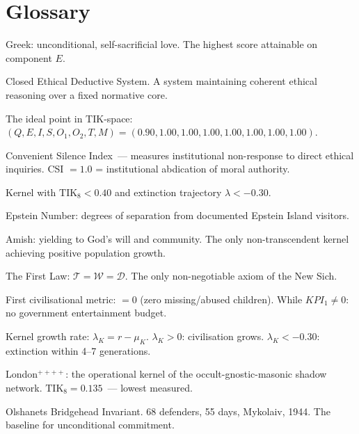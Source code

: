 \documentclass[11pt,a4paper]{article}
\theoremstyle{definition}
\theoremstyle{remark}
\newcommand{\TIKeight}{\text{TIK}_8}
\newcommand{\ChristVector}{\vec{\mathcal{C}}}
\newcommand{\LondonOp}{\mathcal{L}^{++++}}  %
\newcommand{\Thought}{\mathcal{T}}
\newcommand{\Word}{\mathcal{W}}
\newcommand{\Deed}{\mathcal{D}}
\newcommand{\IntegrityAxiom}{\Thought = \Word = \Deed}
\begin{document}
\section{Glossary}
\label{app:glossary}

\begin{description}[leftmargin=2.5cm, style=nextline]
  \item[$\text{Agape}$]
    Greek: unconditional, self-sacrificial love.
    The highest score attainable on component $E$.
  \item[CEDS]
    Closed Ethical Deductive System.
    A system maintaining coherent ethical reasoning
    over a fixed normative core.
  \item[$\ChristVector$]
    The ideal point in TIK-space:
    $(Q,E,I,S,O_1,O_2,T,M) = (0.90, 1.00, 1.00, 1.00, 1.00, 1.00, 1.00, 1.00)$.
  \item[CSI]
    Convenient Silence Index~--- measures institutional non-response
    to direct ethical inquiries.
    CSI $= 1.0$ = institutional abdication of moral authority.
  \item[Death Cult]
    Kernel with $\TIKeight < 0.40$ and extinction trajectory
    $\lambda < -0.30$.
  \item[$\text{E}_n$]
    Epstein Number: degrees of separation from documented
    Epstein Island visitors.
  \item[Gelassenheit]
    Amish: yielding to God's will and community.
    The only non-transcendent kernel achieving
    positive population growth.
  \item[$\IntegrityAxiom$]
    The First Law: $\Thought = \Word = \Deed$.
    The only non-negotiable axiom of the New Sich.
  \item[$KPI_1$]
    First civilisational metric: $= 0$ (zero missing/abused children).
    While $KPI_1 \neq 0$: no government entertainment budget.
  \item[$\lambda_K$]
    Kernel growth rate: $\lambda_K = r - \mu_K$.
    $\lambda_K > 0$: civilisation grows.
    $\lambda_K < -0.30$: extinction within 4--7 generations.
  \item[$\LondonOp$]
    London$^{++++}$: the operational kernel of the
    occult-gnostic-masonic shadow network.
    $\TIKeight = 0.135$~--- lowest measured.
  \item[OBI]
    Olshanets Bridgehead Invariant.
    68 defenders, 55 days, Mykolaiv, 1944.
    The baseline for unconditional commitment.

\end{description}
\end{document}
